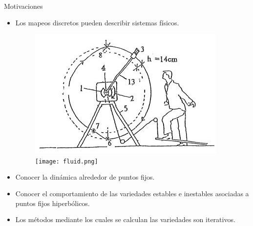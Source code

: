 \documentclass{beamer}		%
\begin{document}
\begin{frame}{Motivaciones}	
\begin{itemize}
    \item Los mapeos discretos pueden describir sistemas f\'isicos.\\
    \begin{figure}
        \centering
        \includegraphics[scale=1.5]{kicked.jpg}
        \texttt{[image: fluid.png]}
        \label{fig:rotor}
    \end{figure}
    \item Conocer la din\'amica alrededor de puntos fijos.\\
    
    \item Conocer el comportamiento de las variedades estables e inestables asociadas a puntos fijos hiperb\'olicos.\\
    
    \item Los m\'etodos mediante los cuales se calculan las variedades son iterativos.\\
\end{itemize}

\end{frame}
\end{document}
